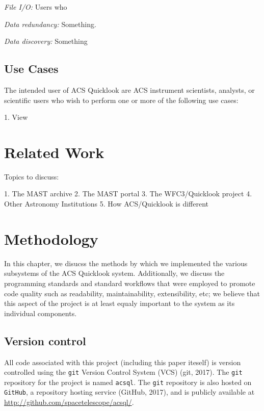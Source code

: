 \documentclass[10pt,journal,compsoc]{IEEEtran}
\begin{document}
\textit{File I/O:} Users who

\textit{Data redundancy:} Something.

\textit{Data discovery:} Something


\subsection{Use Cases}
The intended user of ACS Quicklook are ACS instrument scientists, analysts,
or scientific users who wish to perform one or more of the following use cases:

1. View


\section{Related Work}\label{sec:related_work}

Topics to discuss:

1. The MAST archive
2. The MAST portal
3. The WFC3/Quicklook project
4. Other Astronomy Institutions
5. How ACS/Quicklook is different


\section{Methodology}\label{sec:methodology}

In this chapter, we disucss the methods by which we implemented the various subsystems
of the ACS Quicklook system.  Additionally, we discuss the programming standards and
standard workflows that were employed to promote code quality such as readability,
maintainability, extensibility, etc; we believe that this aspect of the project is
at least equaly important to the system as its individual components.


\subsection{Version control}

All code associated with this project (including this paper iteself) is version
controlled using the \texttt{git} Version Control System (VCS) (git, 2017).
The \texttt{git} repository for the project is named \texttt{acsql}.
The \texttt{git} repository is also hosted on \texttt{GitHub}, a repository
hosting service (GitHub, 2017), and is publicly available at
\url{http://github.com/spacetelescope/acsql/}.
\end{document}
